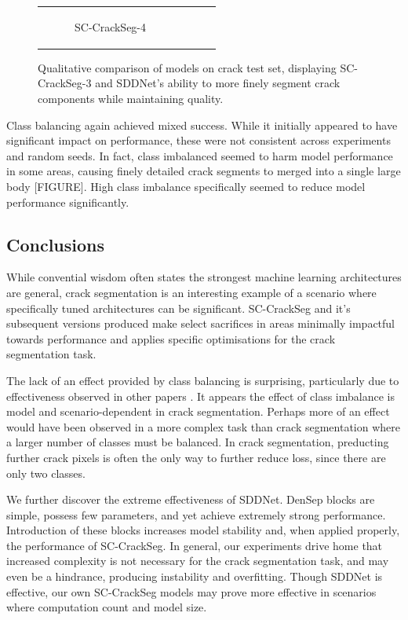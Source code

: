 \documentclass[a4paper,12pt]{report}
\begin{document}
\begin{figure}[htbp]
\begin{tabular}{cccc}
\begin{subfigure}[b]{0.23\textwidth}
            \caption{SC-CrackSeg-4}
            \label{fig:crackseg-experiment-qualitative-sc-crackseg-4}
        \end{subfigure}
    \end{tabular}
    \caption{Qualitative comparison of models on crack test set, displaying SC-CrackSeg-3 and SDDNet's ability to more finely segment crack components while maintaining quality.}
    \label{}
\end{figure}

Class balancing again achieved mixed success. While it initially appeared to have significant impact on performance, these were not consistent across experiments and random seeds. In fact, class imbalanced seemed to harm model performance in some areas, causing finely detailed crack segments to merged into a single large body [FIGURE]. High class imbalance specifically seemed to reduce model performance significantly.

\subsection*{Conclusions}

While convential wisdom often states the strongest machine learning architectures are general, crack segmentation is an interesting example of a scenario where specifically tuned architectures can be significant. SC-CrackSeg and it's subsequent versions produced make select sacrifices in areas minimally impactful towards performance and applies specific optimisations for the crack segmentation task.

The lack of an effect provided by class balancing is surprising, particularly due to effectiveness observed in other papers \cite{liu_deepcrack_2019}. It appears the effect of class imbalance is model and scenario-dependent in crack segmentation. Perhaps more of an effect would have been observed in a more complex task than crack segmentation where a larger number of classes must be balanced. In crack segmentation, preducting further crack pixels is often the only way to further reduce loss, since there are only two classes.

We further discover the extreme effectiveness of SDDNet. DenSep blocks are simple, possess few parameters, and yet achieve extremely strong performance. Introduction of these blocks increases model stability and, when applied properly, the performance of SC-CrackSeg. In general, our experiments drive home that increased complexity is not necessary for the crack segmentation task, and may even be a hindrance, producing instability and overfitting. Though SDDNet is effective, our own SC-CrackSeg models may prove more effective in scenarios where computation count and model size.
\end{document}
